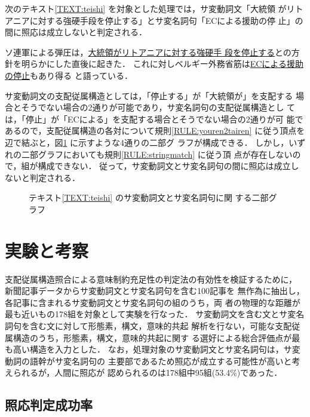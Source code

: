 次のテキスト\ref{TEXT:teishi} を対象とした処理では，サ変動詞文「大統領
がリトアニアに対する強硬手段を停止する」とサ変名詞句「ECによる援助の停
止」の間に照応は成立しないと判定される．
\begin{TEXT}
\text ソ連軍による弾圧は，\underline{大統領がリトアニアに対する強硬手
段を停止する}との方針を明らかにした直後に起きた．
これに対しベルギー外務省筋は\underline{ECによる援助の停止}もあり得る
と語っている．\label{TEXT:teishi}
\end{TEXT}
サ変動詞文の支配従属構造としては，「停止する」が「大統領が」を支配する
場合とそうでない場合の2通りが可能であり，サ変名詞句の支配従属構造とし
ては，「停止」が「ECによる」を支配する場合とそうでない場合の2通りが可
能であるので，支配従属構造の各対について規則\ref{RULE:youren2tairen}
に従う頂点を辺で結ぶと，図\ref{fig:matching2} に示すような4通りの二部グ
ラフが構成できる．
しかし，いずれの二部グラフにおいても規則\ref{RULE:stringmatch} に従う頂
点が存在しないので，組が構成できない． 
従って，サ変動詞文とサ変名詞句の間に照応は成立しないと判定される．
\begin{figure}[htbp]
\begin{center}
\end{center}
\caption{テキスト\protect\ref{TEXT:teishi} のサ変動詞文とサ変名詞句に関
する二部グラフ}
\label{fig:matching2}
\end{figure}

\section{実験と考察}
\label{sec:experiment}

支配従属構造照合による意味制約充足性の判定法の有効性を検証するために，
新聞記事データ\cite{Asahi91}からサ変動詞文とサ変名詞句を含む100記事を
無作為に抽出し，各記事に含まれるサ変動詞文とサ変名詞句の組のうち，両
者の物理的な距離が最も近いもの178組を対象として実験を行なった．
サ変動詞文を含む文とサ変名詞句を含む文に対して形態素，構文，意味的共起
解析を行ない，可能な支配従属構造のうち，形態素，構文，意味的共起に関す
る選好による総合評価点が最も高い構造を入力とした．
なお，処理対象のサ変動詞文とサ変名詞句は，サ変動詞の語幹がサ変名詞句の
主要部であるため照応が成立する可能性が高いと考えられるが，人間に照応が
認められるのは178組中95組(53.4\%)であった．

\subsection{照応判定成功率}

